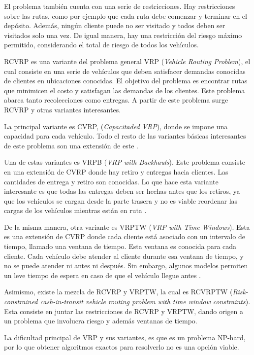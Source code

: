 \documentclass{article}
\begin{document}
El problema también cuenta con una serie de restricciones. Hay restricciones sobre las rutas, como por ejemplo que cada ruta debe comenzar y terminar en el depósito. Además, ningún cliente puede no ser visitado y todos deben ser visitados solo una vez. De igual manera, hay una restricción del riesgo máximo permitido, considerando el total de riesgo de todos los vehículos.

RCVRP es una variante del problema general VRP (\textit{Vehicle Routing Problem}), el cual consiste en una serie de vehículos que deben satisfacer demandas conocidas de clientes en ubicaciones conocidas. El objetivo del problema es encontrar rutas que minimicen el costo y satisfagan las demandas de los clientes. Este problema abarca tanto recolecciones como entregas. A partir de este problema surge RCVRP y otras variantes interesantes.

La principal variante es CVRP, (\textit{Capacitaded VRP}), donde se impone una capacidad para cada vehículo. Todo el resto de las variantes básicas interesantes de este problema son una extensión de este \cite{toth2002overview}.

Una de estas variantes es VRPB (\textit{VRP with Backhauls}). Este problema consiste en una extensión de CVRP donde hay retiro y entregas hacia clientes. Las cantidades de entrega y retiro son conocidas. Lo que hace esta variante interesante es que todas las entregas deben ser hechas antes que los retiros, ya que los vehículos se cargan desde la parte trasera y no es viable reordenar las cargas de los vehículos mientras están en ruta \cite{joetschalckx1989vehicle}.

De la misma manera, otra variante es VRPTW (\textit{VRP with Time Windows}). Esta es una extensión de CVRP donde cada cliente está asociado con un intervalo de tiempo, llamado una ventana de tiempo. Esta ventana es conocida para cada cliente. Cada vehículo debe atender al cliente durante esa ventana de tiempo, y no se puede atender ni antes ni después. Sin embargo, algunos modelos permiten un leve tiempo de espera en caso de que el vehículo llegue antes \cite{ombuki2006multi}. 

Asimismo, existe la mezcla de RCVRP y VRPTW, la cual es RCVRPTW (\textit{Risk-constrained cash-in-transit vehicle routing problem with time window constraints}). Esta consiste en juntar las restricciones de RCVRP y VRPTW, dando origen a un problema que involucra riesgo y además ventanas de tiempo. \cite{talarico2013risk}

La dificultad principal de VRP y sus variantes, es que es un problema NP-hard\cite{lenstra1981complexity}, por lo que obtener algoritmos exactos para resolverlo no es una opción viable.  
\newpage
\end{document}
